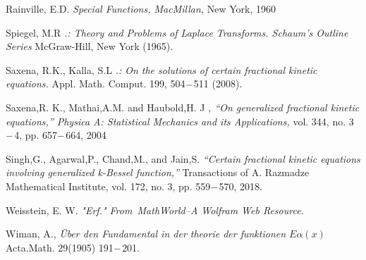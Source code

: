 \documentclass{article}
\begin{document}
\begin{thebibliography}{9}
    Rainville, E.D.
    \textit{Special Functions, MacMillan,}
    New York, 1960

    Spiegel, M.R
    \textit{.: Theory and Problems of Laplace Transforms. Schaum's Outline Series}
    McGraw-Hill, New York (1965).

    Saxena, R.K., Kalla, S.L
    \textit{.: On the solutions of certain fractional kinetic equations.}
    Appl. Math. Comput. 199, 504$\--$511 (2008).

    Saxena,R. K., Mathai,A.M. and Haubold,H. J
    \textit{, “On generalized fractional kinetic equations,” Physica A: Statistical Mechanics and its Applications,}
    vol. 344, no. 3$\--$4, pp. 657$\--$664, 2004

    Singh,G., Agarwal,P., Chand,M., and Jain,S.
    \textit{“Certain fractional kinetic equations involving generalized k-Bessel function,”}
    Transactions of A. Razmadze Mathematical Institute, vol. 172, no. 3, pp. 559$\--$570, 2018.

    Weisstein, E. W.
    \textit{"Erf." From MathWorld--A Wolfram Web Resource.}

    \bibitem{}
    Wiman, A.,
    \textit{\"Uber den Fundamental in der theorie der funktionen $E{\alpha}(x)$}
    Acta.Math. 29(1905) 191$\--$201.
\end{thebibliography}
\end{document}
